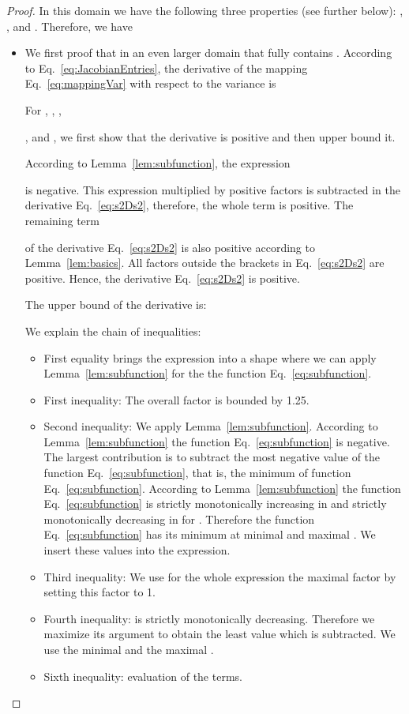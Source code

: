 \documentclass{article}
\begin{document}
\begin{proof}
In this domain  we have the following three properties (see further below):
, ,
and . Therefore, we have




\begin{itemize}
\item We first proof that  in an even larger domain that fully contains .
According to  Eq.~\eqref{eq:JacobianEntries},
the derivative of the mapping  Eq.~\eqref{eq:mappingVar} 
with respect to the variance  is


For 
, , 
, 
 
, and 
, we first show that the derivative is positive
and then upper bound it.

According to  Lemma~\ref{lem:subfunction}, the expression

is negative. This expression multiplied by positive factors is
subtracted in the derivative Eq.~\eqref{eq:s2Ds2}, therefore, the
whole term is positive.
The remaining term

of the derivative Eq.~\eqref{eq:s2Ds2}
is also positive according to Lemma~\ref{lem:basics}.
All factors outside the brackets in  Eq.~\eqref{eq:s2Ds2} are
positive. Hence, the derivative Eq.~\eqref{eq:s2Ds2} is positive.


The upper bound of the derivative is:

We explain the chain of inequalities:
\begin{itemize}
\item First equality brings the expression
into a shape where we can apply  Lemma~\ref{lem:subfunction} for the
the function Eq.~\eqref{eq:subfunction}.
\item First inequality: The overall factor  is bounded by 1.25.
\item Second inequality: We apply Lemma~\ref{lem:subfunction}.
 According to Lemma~\ref{lem:subfunction} the function Eq.~\eqref{eq:subfunction} is negative.
The largest contribution is to subtract the most negative value of 
the function Eq.~\eqref{eq:subfunction}, that is, the minimum of 
function Eq.~\eqref{eq:subfunction}.
According to Lemma~\ref{lem:subfunction} the function
Eq.~\eqref{eq:subfunction} is strictly monotonically increasing in 
and strictly monotonically decreasing in  for .
Therefore the function Eq.~\eqref{eq:subfunction} has its minimum 
at minimal  
and maximal . We insert these values into
the expression.

\item Third inequality: We use for the whole expression 
the maximal factor 
 by setting this
factor to 1.
\item Fourth inequality:  is strictly monotonically
  decreasing. Therefore we maximize its argument to obtain the least
  value which is subtracted. We use the minimal  and the maximal .
\item Sixth inequality: evaluation of the terms.
\end{itemize}


\end{itemize}
\end{proof}
\end{document}
